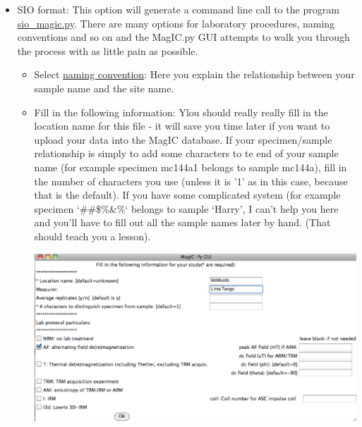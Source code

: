 \documentclass[11pt]{book}
\begin{document}
{
\begin{itemize}
\item SIO format:   This option will generate a command line call to the program \href{#sio_magic.py}{sio\_magic.py}.  There are many options for laboratory procedures, naming conventions and so on and the MagIC.py GUI attempts to walk you through the process with as little pain as possible.  
	\begin{itemize}
	\item Select \href{#naming_schemes}{naming convention}:  Here you explain the relationship between your sample name and the site name.  	
	\item Fill in the following information:  Ylou should really really fill in the location name for this file - it will save you time later if you want to upload your data into the MagIC database.  If your specimen/sample relationship is simply to add some characters to te end of your sample name (for example specimen mc144a1 belongs to sample mc144a), fill in the number of characters you use (unless it is '1' as in this case, because that is the default).  If you have some complicated system (for example specimen `\@\#\#\$\%\&\%` belongs to sample `Harry',  I can't help you here and you'll have to fill out all the sample names later by hand.  (That should teach you a lesson).   
	
		\includegraphics[width=15cm]{EPSfiles/make_sio.eps}
		

\end{itemize}
\end{itemize}}
\end{document}
